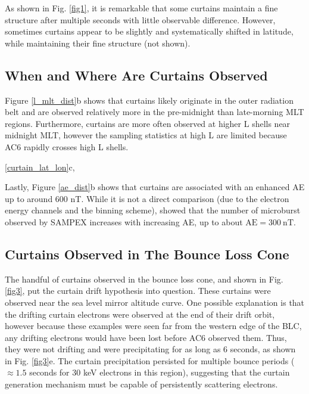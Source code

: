 \documentclass[draft]{agujournal2019}
\begin{document}
As shown in Fig. \ref{fig1}, it is remarkable that some curtains maintain a fine structure after multiple seconds with little observable difference. However, sometimes curtains appear to be slightly and systematically shifted in latitude, while maintaining their fine structure (not shown).

\subsection{When and Where Are Curtains Observed}
Figure \ref{l_mlt_dist}b shows that curtains likely originate in the outer radiation belt  and are observed relatively more in the pre-midnight than late-morning MLT regions. Furthermore, curtains are more often observed at higher L shells near midnight MLT, however the sampling statistics at high L are limited because AC6 rapidly crosses high L shells.  

 \ref{curtain_lat_lon}c, 

Lastly, Figure \ref{ae_dist}b shows that curtains are associated with an enhanced AE up to around 600 nT. While it is not a direct comparison (due to the electron energy channels and the binning scheme),  showed that the number of microburst observed by SAMPEX increases with increasing AE, up to about $\mathrm{AE} = 300 \ \mathrm{nT}$.
 
\subsection{Curtains Observed in The Bounce Loss Cone}
The handful of curtains observed in the bounce loss cone, and shown in Fig. \ref{fig3}, put the  curtain drift hypothesis into question. These curtains were observed near the sea level mirror altitude curve. One possible explanation is that the drifting curtain electrons were observed at the end of their drift orbit, however because these examples were seen far from the western edge of the BLC, any drifting electrons would have been lost before AC6 observed them. Thus, they were not drifting and were precipitating for as long as 6 seconds, as shown in Fig. \ref{fig3}e. The curtain precipitation persisted for multiple bounce periods ($\approx 1.5$ seconds for 30 keV electrons in this region), suggesting that the curtain generation mechanism must be capable of persistently scattering electrons. 
\end{document}
